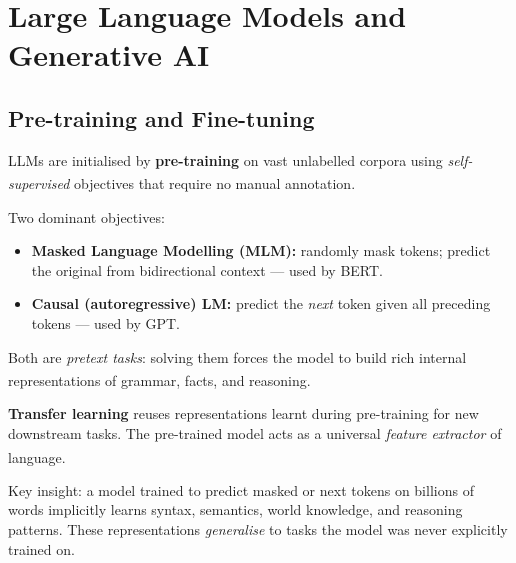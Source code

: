\section{Large Language Models and Generative AI}

\subsection{Pre-training and Fine-tuning}

\begin{tcbitemize}[ skin=sectionraster ]

    \tcbitem[title=Pre-training Objectives, raster multicolumn=3]
    LLMs are initialised by \textbf{pre-training} on vast unlabelled corpora using
    \emph{self-supervised} objectives that require no manual
    annotation.\textsuperscript{\cite[][p.~9]{dhamaniIntroductionGenerativeAI2024}}

    Two dominant objectives:
    \begin{itemize}
        \item \textbf{Masked Language Modelling (MLM):} randomly mask tokens; predict
              the original from bidirectional context --- used by BERT.
        \item \textbf{Causal (autoregressive) LM:} predict the \emph{next} token given
              all preceding tokens --- used by GPT.
    \end{itemize}

    Both are \emph{pretext tasks}: solving them forces the model to build rich internal
    representations of grammar, facts, and
    reasoning.\textsuperscript{\cite[][p.~5]{raschkaBuildLargeLanguage2025}}

    \tcbitem[title=Transfer Learning, raster multicolumn=3]
    \textbf{Transfer learning} reuses representations learnt during pre-training for new
    downstream tasks. The pre-trained model acts as a universal \emph{feature extractor}
    of language.\textsuperscript{\cite[][p.~9]{dhamaniIntroductionGenerativeAI2024}}

    Key insight: a model trained to predict masked or next tokens on billions of words
    implicitly learns syntax, semantics, world knowledge, and reasoning patterns. These
    representations \emph{generalise} to tasks the model was never explicitly trained on.


\end{tcbitemize}
